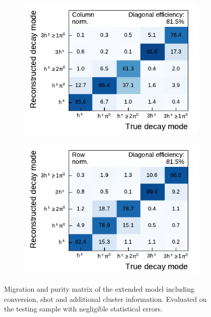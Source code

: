 \begin{figure}[htb]
  \begin{subfigure}{0.48\textwidth}
    \centering
    \includegraphics{./figures/decay_mode_classification/combined_sub_e_moments_shots_conv_ptcut_1_5/mig_mat.pdf}
  \end{subfigure}\hfill
  \begin{subfigure}{0.48\textwidth}
    \centering
    \includegraphics{./figures/decay_mode_classification/combined_sub_e_moments_shots_conv_ptcut_1_5/comp_mat.pdf}
  \end{subfigure}
  \caption[Migration and purity matrices of the extended model for decay mode
  classification]{Migration and purity matrix of the extended model including
    conversion, shot and additional cluster information. Evaluated on the
    testing sample with negligible statistical errors.}
  \label{fig:decay_mode_combined}
\end{figure}

